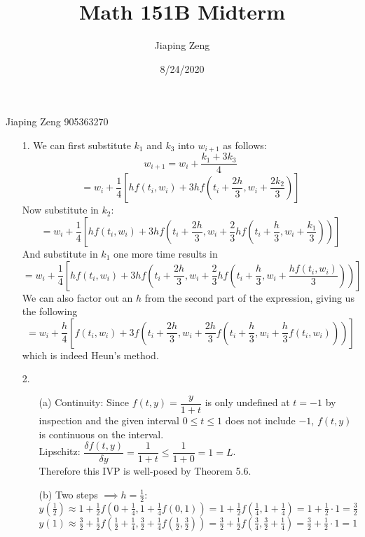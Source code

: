 \documentclass{article}
\title{Math 151B Midterm}
\author{Jiaping Zeng}
\date{8/24/2020}
\begin{document}

Jiaping Zeng 905363270

\newpage
\begin{itemize}
    \item [1.] We can first substitute $k_1$ and $k_3$ into $w_{i+1}$ as follows: \[w_{i+1}=w_i+\dfrac{k_1+3k_3}{4}\]\[=w_i+\dfrac{1}{4}[hf(t_i,w_i)+3hf(t_i+\frac{2h}{3}, w_i+\frac{2k_2}{3})]\] Now substitute in $k_2$: \[=w_i+\dfrac{1}{4}[hf(t_i,w_i)+3hf(t_i+\frac{2h}{3}, w_i+\frac{2}{3}hf(t_i+\frac{h}{3},w_i+\frac{k_1}{3}))]\] And substitute in $k_1$ one more time results in \[=w_i+\dfrac{1}{4}[hf(t_i,w_i)+3hf(t_i+\frac{2h}{3}, w_i+\frac{2}{3}hf(t_i+\frac{h}{3},w_i+\frac{hf(t_i,w_i)}{3}))]\] We can also factor out an $h$ from the second part of the expression, giving us the following \[=w_i+\dfrac{h}{4}[f(t_i,w_i)+3f(t_i+\frac{2h}{3}, w_i+\frac{2h}{3}f(t_i+\frac{h}{3},w_i+\frac{h}{3}f(t_i,w_i)))]\] which is indeed Heun's method.
\end{itemize}

\newpage
\begin{itemize}
    \item [2.] \begin{itemize}
        \item [(a)] Continuity: Since $f(t,y)=\dfrac{y}{1+t}$ is only undefined at $t=-1$ by inspection and the given interval $0\leq t\leq 1$ does not include $-1$, $f(t,y)$ is continuous on the interval.\\Lipschitz: $\dfrac{\delta f(t,y)}{\delta y}=\dfrac{1}{1+t}\leq\dfrac{1}{1+0}=1=L$.\\ Therefore this IVP is well-posed by Theorem 5.6.
        \item [(b)] Two steps $\implies h=\frac{1}{2}$:\\$y(\frac{1}{2})\approx 1+\frac{1}{2}f(0+\frac{1}{4},1+\frac{1}{4}f(0,1))=1+\frac{1}{2}f(\frac{1}{4},1+\frac{1}{4})=1+\frac{1}{2}\cdot 1=\frac{3}{2}$\\$y(1)\approx \frac{3}{2}+\frac{1}{2}f(\frac{1}{2}+\frac{1}{4},\frac{3}{2}+\frac{1}{4}f(\frac{1}{2},\frac{3}{2}))=\frac{3}{2}+\frac{1}{2}f(\frac{3}{4},\frac{3}{2}+\frac{1}{4})=\frac{3}{2}+\frac{1}{2}\cdot 1=\boxed{1}$
    \end{itemize}
\end{itemize}
\end{document}
